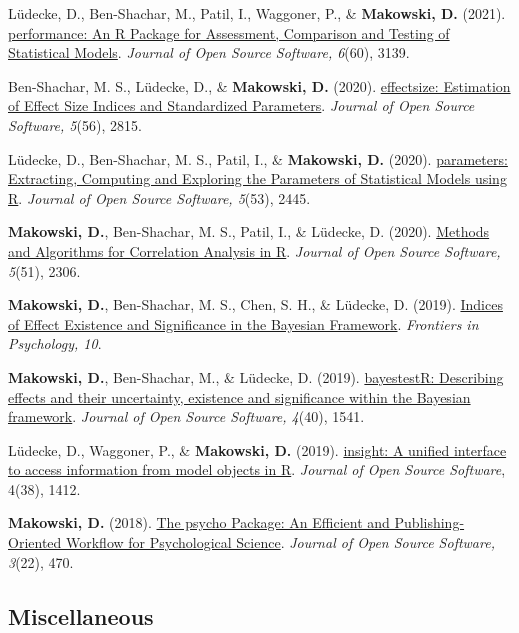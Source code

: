 \documentclass[11pt,a4paper,]{awesome-cv}
\begin{document}
Lüdecke, D., Ben-Shachar, M., Patil, I., Waggoner, P., \&
\textbf{Makowski, D.} (2021).
\href{https://joss.theoj.org/papers/10.21105/joss.03139}{performance: An
R Package for Assessment, Comparison and Testing of Statistical Models}.
\emph{Journal of Open Source Software, 6}(60), 3139.

Ben-Shachar, M. S., Lüdecke, D., \& \textbf{Makowski, D.} (2020).
\href{https://joss.theoj.org/papers/10.21105/joss.02815}{effectsize:
Estimation of Effect Size Indices and Standardized Parameters}.
\emph{Journal of Open Source Software, 5}(56), 2815.

Lüdecke, D., Ben-Shachar, M. S., Patil, I., \& \textbf{Makowski, D.}
(2020).
\href{https://joss.theoj.org/papers/10.21105/joss.02445}{parameters:
Extracting, Computing and Exploring the Parameters of Statistical Models
using R}. \emph{Journal of Open Source Software, 5}(53), 2445.

\textbf{Makowski, D.}, Ben-Shachar, M. S., Patil, I., \& Lüdecke, D.
(2020). \href{https://joss.theoj.org/papers/10.21105/joss.02306}{Methods
and Algorithms for Correlation Analysis in R}. \emph{Journal of Open
Source Software, 5}(51), 2306.

\textbf{Makowski, D.}, Ben-Shachar, M. S., Chen, S. H., \& Lüdecke, D.
(2019).
\href{https://dominiquemakowski.github.io/publication/makowski2019indices/makowski2019indices.pdf}{Indices
of Effect Existence and Significance in the Bayesian Framework}.
\emph{Frontiers in Psychology, 10}.

\textbf{Makowski, D.}, Ben-Shachar, M., \& Lüdecke, D. (2019).
\href{https://joss.theoj.org/papers/10.21105/joss.01541}{bayestestR:
Describing effects and their uncertainty, existence and significance
within the Bayesian framework}. \emph{Journal of Open Source Software,
4}(40), 1541.

Lüdecke, D., Waggoner, P., \& \textbf{Makowski, D.} (2019).
\href{https://joss.theoj.org/papers/10.21105/joss.01412}{insight: A
unified interface to access information from model objects in R}.
\emph{Journal of Open Source Software}, 4(38), 1412.

\textbf{Makowski, D.} (2018).
\href{https://dominiquemakowski.github.io/publication/makowski2018psycho/makowski2018psycho.pdf}{The
psycho Package: An Efficient and Publishing-Oriented Workflow for
Psychological Science}. \emph{Journal of Open Source Software, 3}(22),
470.

\normalsize

\subsection{Miscellaneous}\label{miscellaneous-1}
\end{document}
